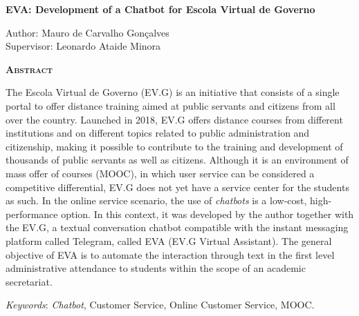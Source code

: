 \begin{center}
	{\Large{\textbf{EVA: Development of a Chatbot for Escola Virtual de Governo}}}
\end{center}

\vspace{1cm}

\begin{flushright}
	Author: Mauro de Carvalho Gonçalves\\
	Supervisor: Leonardo Ataide Minora
\end{flushright}

\vspace{1cm}

\begin{center}
	\Large{\textsc{\textbf{Abstract}}}
\end{center}

\noindent The Escola Virtual de Governo (EV.G) is an initiative that consists of a single portal to offer distance training aimed at public servants and citizens from all over the country.
Launched in 2018, EV.G offers distance courses from different institutions and on different topics related to public administration and citizenship, making it possible to contribute to the training and development of thousands of public servants as well as citizens.
Although it is an environment of mass offer of courses (MOOC), in which user service can be considered a competitive differential, EV.G does not yet have a service center for the students as such.
In the online service scenario, the use of \textit{chatbots} is a low-cost, high-performance option.
In this context, it was developed by the author together with the EV.G, a textual conversation chatbot compatible with the instant messaging platform called Telegram, called EVA (EV.G Virtual Assistant). The general objective of EVA is to automate the interaction through text in the first level administrative attendance to students within the scope of an academic secretariat.

\noindent\textit{Keywords}: \textit{Chatbot}, Customer Service, Online Customer Service, MOOC.